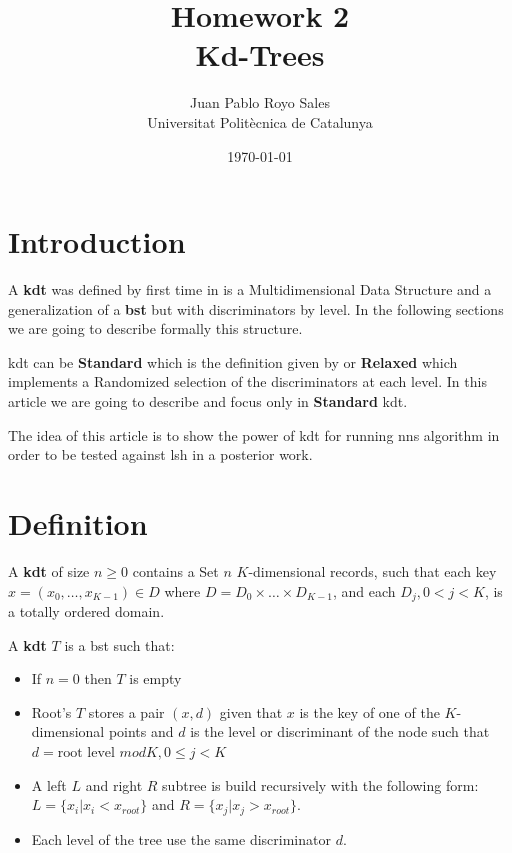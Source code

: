 \documentclass[12pt, a4paper]{article}
\title{%
      Homework 2 \\
      Kd-Trees
}
\author{%
  Juan Pablo Royo Sales\\
  \small{Universitat Politècnica de Catalunya}
}
\date\today
\begin{document}
\maketitle

\medskip

\section{Introduction}
A \textbf{\acrfull{kdt}} was defined by first time in \cite{bentley} is a Multidimensional Data Structure and a generalization of a \textbf{\acrfull{bst}} but with discriminators by level. In the following sections we are going to describe formally this structure.

\acrshort{kdt} can be \textbf{Standard} which is the definition given by \cite{bentley} or \textbf{Relaxed} which implements a Randomized selection of the discriminators at each level. In this article we are going to describe and focus only in \textbf{Standard} \acrshort{kdt}.

The idea of this article is to show the power of \acrshort{kdt} for running \acrfull{nns} algorithm in order to be tested against \acrfull{lsh} in a posterior work.

\section{Definition}
A \textbf{\acrshort{kdt}} of size $n \geq 0$ contains a Set $n$ $K$-dimensional records, such that each key $x = (x_0, \dots , x_{K-1}) \in D$ where  $D = D_0 \times \dots \times D_{K-1}$, and each $D_j, 0 < j < K$, is a totally ordered domain.

A \textbf{\acrshort{kdt}} $T$ is a \acrshort{bst} such that:

\begin{itemize}
    \item If $n = 0$ then $T$ is empty
    \item Root's $T$ stores a pair $(x,d)$ given that $x$ is the key of one of the $K$-dimensional points and $d$ is the level or discriminant of the node such that $ d = \text{root level } mod K, 0 \leq j < K$
    \item A left $L$ and right $R$ subtree is build recursively with the following form: $ L = \{ x_i | x_i < x_{root} \}$ and $R = \{x_j | x_j > x_{root}\}$.
    \item Each level of the tree use the same discriminator $d$.
\end{itemize}
\end{document}
